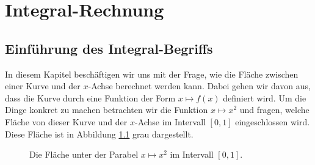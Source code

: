 \chapter{Integral-Rechnung}
\section{Einf\"uhrung des Integral-Begriffs}
In diesem Kapitel besch\"aftigen wir uns mit der Frage, wie die Fl\"ache zwischen einer Kurve und der
$x$-Achse berechnet werden kann.  Dabei gehen wir davon aus, dass die Kurve durch eine Funktion der
Form $x \mapsto f(x)$ definiert wird.  Um die Dinge konkret zu machen betrachten wir die Funktion 
$x \mapsto x^2$ und fragen, welche Fl\"ache von dieser Kurve und der $x$-Achse im Intervall
$[0,1]$ eingeschlossen wird.  Diese Fl\"ache ist in Abbildung \ref{fig:xhoch2int.eps} 
grau dargestellt.  


\begin{figure}[!h]
  \centering
   \caption{Die Fl\"ache unter der Parabel $x \mapsto x^2$ im Intervall $[0,1]$.}
  \label{fig:xhoch2int.eps}
\end{figure}

